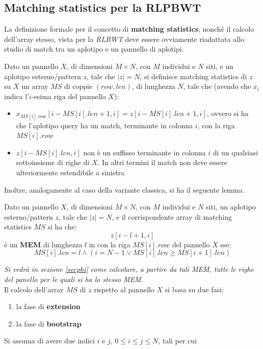 \subsection{Matching statistics per la RLPBWT}
La definizione formale per il concetto di \textbf{matching statistics}, nonché
il calcolo dell'array stesso, vista per
la \textit{RLBWT} deve essere ovviamente riadattata allo studio di match tra un
aplotipo e un pannello di aplotipi.
\begin{definizione}
  Dato un pannello $X$, di dimensioni $M\times N$, con $M$ individui e $N$ siti,
  e un aplotipo esterno/pattern $z$, tale che $|z|=N$, si definisce matching
  statistics di $z$ su $X$ un array $MS$ di coppie $(row,len)$, di lunghezza
  $N$, tale che (avendo che $x_i$ indica l'$i$-esima riga del pannello $X$): 
  \begin{itemize}
    \item $x_{MS[i].row}[i-MS[i].len+1,i]=z[i-MS[i].len+1,i]$, ovvero si ha che
    l'aplotipo query ha un match, terminante in colonna $i$, con la riga
    $MS[i].row$  
    \item $z[i-MS[i].len,i]$ non è un suffisso terminante in colonna $i$ di un
    qualsiasi sottoinsieme di righe di $X$. In altri termini il match non deve
    essere ulteriormente estendibile a sinistra
  \end{itemize}
\end{definizione}
Inoltre, analogamente al caso della variante classica, si ha il seguente lemma.
\begin{lemma}
  Dato un pannello $X$, di dimensioni $M\times N$, con $M$ individui e $N$
  siti, un aplotipo esterno/pattern $z$, tale che $|z|=N$, e il corrispondente
  array di matching statistics $MS$ si ha che:
  \[z[i-l+1,i]\]
  è un \textbf{MEM} di lunghezza $l$ in con la riga $MS[i].row$ del pannello
  $X$ sse: 
  \[MS[i].len=l\land(i=N-1\lor MS[i].len\geq MS[i+1].len)\]
\end{lemma}
\textit{Si vedrà in sezione \ref{secphi} come calcolare, a partire da tali
  \emph{MEM}, tutte le righe del panello per le quali si ha lo stesso
  \textup{MEM}}.\\
Il calcolo dell'array $MS$ di $z$ rispetto al pannello $X$ si basa su due fasi:
\begin{enumerate}
  \item la fase di \textbf{extension}
  \item la fase di \textbf{bootstrap}
\end{enumerate}
Si assuma di avere due indici $i$ e $j$, $0\leq i\leq j\leq N$, tali per cui
